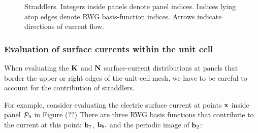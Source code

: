 \documentclass[letterpaper]{article}
\begin{document}
\begin{figure}
\begin{center}
\caption{Straddlers. 
         Integers inside panels denote panel indices.
         Indices lying atop edges denote RWG basis-function indices.
         Arrows indicate directions of current flow.}
\label{StraddlerFigure}
\end{center}
\end{figure}

\subsubsection{Evaluation of surface currents within the unit cell}

When evaluating the $\mathbf{K}$ and $\mathbf{N}$ surface-current 
distributions at panels that border the upper or right edges 
of the unit-cell mesh, we have to be careful to account for the 
contribution of straddlers. 

For example, consider evaluating the electric surface current at 
points $\mathbf{x}$ inside panel $\mathcal{P}_9$ in Figure (??) %
There are three RWG basis functions that contribute to the current
at this point: $\mathbf{b}_7$, $\mathbf{b}_9,$ and the periodic image of 
$\mathbf{b}_2$:
\end{document}
